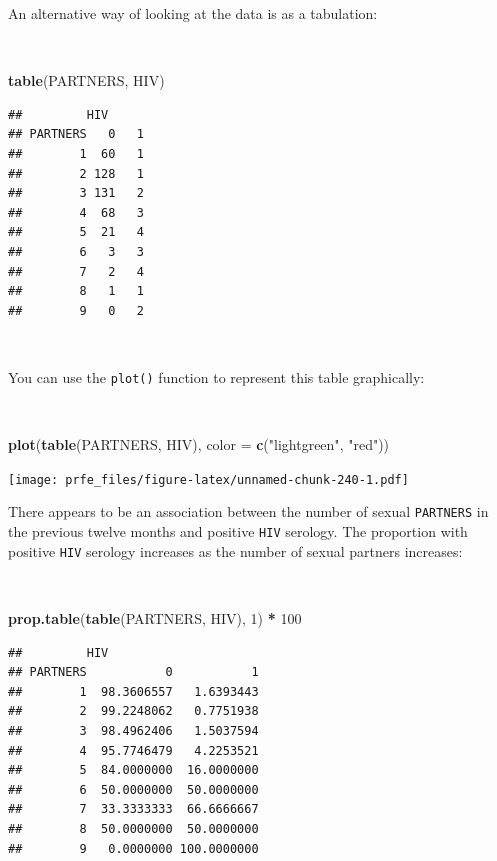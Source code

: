\documentclass[12pt,a4paper]{book}
\newenvironment{Shaded}{\begin{snugshade}}{\end{snugshade}}
\newcommand{\KeywordTok}[1]{\textcolor[rgb]{0.13,0.29,0.53}{\textbf{#1}}}
\newcommand{\DataTypeTok}[1]{\textcolor[rgb]{0.13,0.29,0.53}{#1}}
\newcommand{\DecValTok}[1]{\textcolor[rgb]{0.00,0.00,0.81}{#1}}
\newcommand{\StringTok}[1]{\textcolor[rgb]{0.31,0.60,0.02}{#1}}
\newcommand{\OperatorTok}[1]{\textcolor[rgb]{0.81,0.36,0.00}{\textbf{#1}}}
\newcommand{\NormalTok}[1]{#1}
\theoremstyle{definition}
\theoremstyle{definition}
\theoremstyle{definition}
\theoremstyle{remark}
\begin{document}
\newpage

An alternative way of looking at the data is as a tabulation:

~

\begin{Shaded}
\begin{Highlighting}[]
\KeywordTok{table}\NormalTok{(PARTNERS, HIV)}
\end{Highlighting}
\end{Shaded}

\begin{verbatim}
##         HIV
## PARTNERS   0   1
##        1  60   1
##        2 128   1
##        3 131   2
##        4  68   3
##        5  21   4
##        6   3   3
##        7   2   4
##        8   1   1
##        9   0   2
\end{verbatim}

~

You can use the \texttt{plot()} function to represent this table
graphically:

~

\begin{Shaded}
\begin{Highlighting}[]
\KeywordTok{plot}\NormalTok{(}\KeywordTok{table}\NormalTok{(PARTNERS, HIV), }\DataTypeTok{color =} \KeywordTok{c}\NormalTok{(}\StringTok{"lightgreen"}\NormalTok{, }\StringTok{"red"}\NormalTok{))}
\end{Highlighting}
\end{Shaded}

\texttt{[image: prfe\_files/figure-latex/unnamed-chunk-240-1.pdf]}

\newpage

There appears to be an association between the number of sexual
\texttt{PARTNERS} in the previous twelve months and positive
\texttt{HIV} serology. The proportion with positive \texttt{HIV}
serology increases as the number of sexual partners increases:

~

\begin{Shaded}
\begin{Highlighting}[]
\KeywordTok{prop.table}\NormalTok{(}\KeywordTok{table}\NormalTok{(PARTNERS, HIV), }\DecValTok{1}\NormalTok{) }\OperatorTok{*}\StringTok{ }\DecValTok{100}
\end{Highlighting}
\end{Shaded}

\begin{verbatim}
##         HIV
## PARTNERS           0           1
##        1  98.3606557   1.6393443
##        2  99.2248062   0.7751938
##        3  98.4962406   1.5037594
##        4  95.7746479   4.2253521
##        5  84.0000000  16.0000000
##        6  50.0000000  50.0000000
##        7  33.3333333  66.6666667
##        8  50.0000000  50.0000000
##        9   0.0000000 100.0000000
\end{verbatim}
\end{document}
